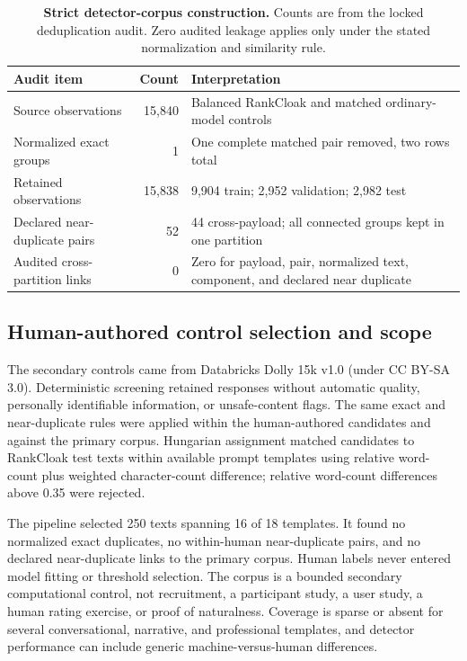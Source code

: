 \documentclass[fleqn,10pt]{wlscirep}
\begin{document}
\begin{table}[H]
\centering
\small
\begin{tabularx}{\textwidth}{L{0.27\textwidth}r Y}
\toprule
Audit item & Count & Interpretation \\
\midrule
Source observations & 15,840 & Balanced RankCloak and matched ordinary-model controls \\
Normalized exact groups & 1 & One complete matched pair removed, two rows total \\
Retained observations & 15,838 & 9,904 train; 2,952 validation; 2,982 test \\
Declared near-duplicate pairs & 52 & 44 cross-payload; all connected groups kept in one partition \\
Audited cross-partition links & 0 & Zero for payload, pair, normalized text, component, and declared near duplicate \\
\bottomrule
\end{tabularx}
\caption{\label{tab:v3-dedup}\textbf{Strict detector-corpus construction.} Counts are from the locked  deduplication audit. Zero audited leakage applies only under the stated normalization and similarity rule.}
\end{table}

\subsection*{Human-authored control selection and scope}

The secondary controls came from Databricks Dolly 15k v1.0 (under CC BY-SA 3.0). Deterministic screening retained responses without automatic quality, personally identifiable information, or unsafe-content flags. The same exact and near-duplicate rules were applied within the human-authored candidates and against the primary corpus. Hungarian assignment matched candidates to RankCloak test texts within available prompt templates using relative word-count plus weighted character-count difference; relative word-count differences above 0.35 were rejected.

The pipeline selected 250 texts spanning 16 of 18 templates. It found no normalized exact duplicates, no within-human near-duplicate pairs, and no declared near-duplicate links to the primary corpus. Human labels never entered model fitting or threshold selection. The corpus is a bounded secondary computational control, not recruitment, a participant study, a user study, a human rating exercise, or proof of naturalness. Coverage is sparse or absent for several conversational, narrative, and professional templates, and detector performance can include generic machine-versus-human differences.
\end{document}
